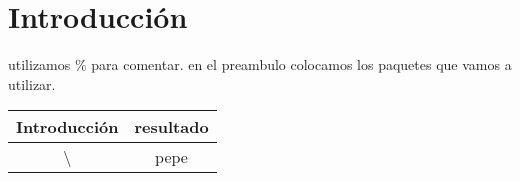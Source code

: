 \documentclass{book}
\begin{document}
    
\section{Introducción}
utilizamos \% para comentar. en el preambulo colocamos los paquetes que vamos a utilizar.


\begin{tabular}{c|c}\hline
Introducción & resultado \\ \hline \hline
\textbackslash & pepe \\ 
    
\end{tabular}
\end{document}

